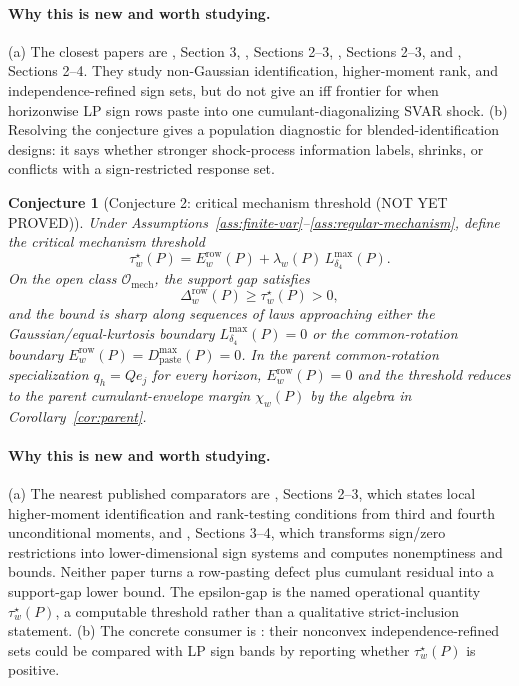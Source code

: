 \documentclass[11pt]{article}
\theoremstyle{definition}
\theoremstyle{plain}
\newtheorem{conjecture}{Conjecture}
\theoremstyle{remark}
\begin{document}
\paragraph{Why this is new and worth studying.}
(a) The closest papers are \citet{GourierouxMonfortRenne2017}, Section 3, \citet{LanneMeitzSaikkonen2017}, Sections 2--3, \citet{Guay2021}, Sections 2--3, and \citet{DrautzburgWright2023}, Sections 2--4.  They study non-Gaussian identification, higher-moment rank, and independence-refined sign sets, but do not give an iff frontier for when horizonwise LP sign rows paste into one cumulant-diagonalizing SVAR shock.  (b) Resolving the conjecture gives \citet{CarrieroMarcellinoTornese2024} a population diagnostic for blended-identification designs: it says whether stronger shock-process information labels, shrinks, or conflicts with a sign-restricted response set.

\begin{conjecture}[Conjecture 2: critical mechanism threshold (NOT YET PROVED)]\label{conj:critical-threshold}
Under Assumptions~\ref{ass:finite-var}--\ref{ass:regular-mechanism}, define the critical mechanism threshold
\[
\tau_w^\star(P)=
E_w^{\mathrm{row}}(P)+
\lambda_w(P)\,L_{\delta_4}^{\max}(P).
\]
On the open class \(\mathcal O_{\mathrm{mech}}\), the support gap satisfies
\[
\Delta_w^{\mathrm{row}}(P)\ge \tau_w^\star(P)>0,
\]
and the bound is sharp along sequences of laws approaching either the Gaussian/equal-kurtosis boundary \(L_{\delta_4}^{\max}(P)=0\) or the common-rotation boundary \(E_w^{\mathrm{row}}(P)=D_{\mathrm{paste}}^{\max}(P)=0\).  In the parent common-rotation specialization \(q_h=Qe_j\) for every horizon, \(E_w^{\mathrm{row}}(P)=0\) and the threshold reduces to the parent cumulant-envelope margin \(\chi_w(P)\) by the algebra in Corollary~\ref{cor:parent}.
\end{conjecture}
\paragraph{Why this is new and worth studying.}
(a) The nearest published comparators are \citet{Guay2021}, Sections 2--3, which states local higher-moment identification and rank-testing conditions from third and fourth unconditional moments, and \citet{Read2022}, Sections 3--4, which transforms sign/zero restrictions into lower-dimensional sign systems and computes nonemptiness and bounds.  Neither paper turns a row-pasting defect plus cumulant residual into a support-gap lower bound.  The epsilon-gap is the named operational quantity \(\tau_w^\star(P)\), a computable threshold rather than a qualitative strict-inclusion statement.  (b) The concrete consumer is \citet{DrautzburgWright2023}: their nonconvex independence-refined sets could be compared with LP sign bands by reporting whether \(\tau_w^\star(P)\) is positive.
\end{document}
